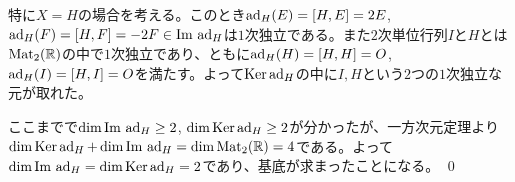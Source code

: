 特に$X = H$の場合を考える。このとき$\ad_H(E) = [H, E] = 2E$, $\ad_H(F) = [H, F] = -2F \in \Im \ad_H$は$1$次独立である。また$2$次単位行列$I$と$H$とは$\Mat_2(\mathbb{R})$の中で$1$次独立であり、ともに$\ad_H(H) = [H, H] = O$, $\ad_H(I) = [H, I] = O$を満たす。よって$\Ker \ad_H$の中に$I, H$という$2$つの$1$次独立な元が取れた。

ここまでで$\dim \Im \ad_H \geq 2$, $\dim \Ker \ad_H \geq 2$が分かったが、一方次元定理より$\dim \Ker \ad_H + \dim \Im \ad_H = \dim \Mat_2(\mathbb{R}) = 4$である。よって$\dim \Im \ad_H = \dim \Ker \ad_H = 2$であり、基底が求まったことになる。 \qed


